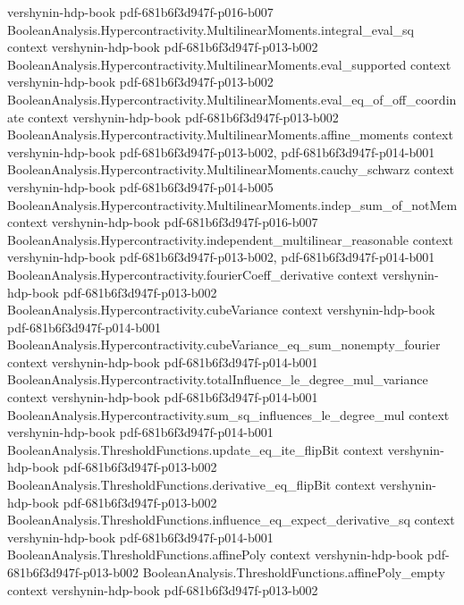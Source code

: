 \begin{theorem}
  {vershynin-hdp-book}
  {pdf-681b6f3d947f-p016-b007}
\proofstep
  {BooleanAnalysis.Hypercontractivity.MultilinearMoments.integral_eval_sq}
  {context}
  {vershynin-hdp-book}
  {pdf-681b6f3d947f-p013-b002}
\proofstep
  {BooleanAnalysis.Hypercontractivity.MultilinearMoments.eval_supported}
  {context}
  {vershynin-hdp-book}
  {pdf-681b6f3d947f-p013-b002}
\proofstep
  {BooleanAnalysis.Hypercontractivity.MultilinearMoments.eval_eq_of_off_coordinate}
  {context}
  {vershynin-hdp-book}
  {pdf-681b6f3d947f-p013-b002}
\proofstep
  {BooleanAnalysis.Hypercontractivity.MultilinearMoments.affine_moments}
  {context}
  {vershynin-hdp-book}
  {pdf-681b6f3d947f-p013-b002,
    pdf-681b6f3d947f-p014-b001}
\proofstep
  {BooleanAnalysis.Hypercontractivity.MultilinearMoments.cauchy_schwarz}
  {context}
  {vershynin-hdp-book}
  {pdf-681b6f3d947f-p014-b005}
\proofstep
  {BooleanAnalysis.Hypercontractivity.MultilinearMoments.indep_sum_of_notMem}
  {context}
  {vershynin-hdp-book}
  {pdf-681b6f3d947f-p016-b007}
\proofstep
  {BooleanAnalysis.Hypercontractivity.independent_multilinear_reasonable}
  {context}
  {vershynin-hdp-book}
  {pdf-681b6f3d947f-p013-b002,
    pdf-681b6f3d947f-p014-b001}
\proofstep
  {BooleanAnalysis.Hypercontractivity.fourierCoeff_derivative}
  {context}
  {vershynin-hdp-book}
  {pdf-681b6f3d947f-p013-b002}
\proofstep
  {BooleanAnalysis.Hypercontractivity.cubeVariance}
  {context}
  {vershynin-hdp-book}
  {pdf-681b6f3d947f-p014-b001}
\proofstep
  {BooleanAnalysis.Hypercontractivity.cubeVariance_eq_sum_nonempty_fourier}
  {context}
  {vershynin-hdp-book}
  {pdf-681b6f3d947f-p014-b001}
\proofstep
  {BooleanAnalysis.Hypercontractivity.totalInfluence_le_degree_mul_variance}
  {context}
  {vershynin-hdp-book}
  {pdf-681b6f3d947f-p014-b001}
\proofstep
  {BooleanAnalysis.Hypercontractivity.sum_sq_influences_le_degree_mul}
  {context}
  {vershynin-hdp-book}
  {pdf-681b6f3d947f-p014-b001}
\proofstep
  {BooleanAnalysis.ThresholdFunctions.update_eq_ite_flipBit}
  {context}
  {vershynin-hdp-book}
  {pdf-681b6f3d947f-p013-b002}
\proofstep
  {BooleanAnalysis.ThresholdFunctions.derivative_eq_flipBit}
  {context}
  {vershynin-hdp-book}
  {pdf-681b6f3d947f-p013-b002}
\proofstep
  {BooleanAnalysis.ThresholdFunctions.influence_eq_expect_derivative_sq}
  {context}
  {vershynin-hdp-book}
  {pdf-681b6f3d947f-p014-b001}
\proofstep
  {BooleanAnalysis.ThresholdFunctions.affinePoly}
  {context}
  {vershynin-hdp-book}
  {pdf-681b6f3d947f-p013-b002}
\proofstep
  {BooleanAnalysis.ThresholdFunctions.affinePoly_empty}
  {context}
  {vershynin-hdp-book}
  {pdf-681b6f3d947f-p013-b002}
\proofstep

\end{theorem}
